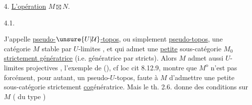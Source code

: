

4.  \uline{L'opération} $M\boxtimes N$.

4.1. 

J'appelle  \uline{pseudo-$\unsure{U|\mathcal U}$-topos}, ou simplement \uline{pseudo-topos}, une catégorie $M$ stable par $U$-limites , et qui admet une \uline{petite} sous-catégorie $M_0$  \uline{strictement génératrice} (i.e. génératrice par  stricts). Alors $M$ admet aussi  $U$-limites projectives , \deleted{[Mais} l'exemple de (), cf loc cit 8.12.9, montre que $M^{\mathrm{o}}$ n'est pas forcément, pour autant, un pseudo-$U$-topos, faute à $M$ d'admettre une petite  sous-catégorie strictement \uline{co}génératrice. Mais le th. 2.6. donne des conditions sur $M$ ( du type )
